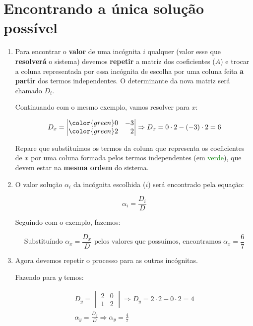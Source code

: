 \section{Encontrando a única solução possível}

\begin{enumerate}
    \item Para encontrar o \textbf{valor} de uma incógnita $i$ qualquer (valor esse que \textbf{resolverá} o sistema) devemos \textbf{repetir} a matriz dos coeficientes ($A$) e trocar a coluna representada por essa incógnita de escolha por uma coluna feita \textbf{a partir} dos termos independentes. O determinante da nova matriz será chamado $D_i$.
    
    Continuando com o mesmo exemplo, vamos resolver para $x$:
    
    $$
    D_x=\begin{vmatrix*}[r]
    \color{green}0 & -3\\ \color{green}2 & 2
    \end{vmatrix*} \Rightarrow \\
    D_x=0 \cdot 2 -(-3)\cdot 2 = 6
    $$
    
    Repare que substituímos os termos da coluna que representa os coeficientes de $x$ por uma coluna formada pelos termos independentes (em \textcolor{green}{verde}), que devem estar na \textbf{mesma ordem} do sistema.
    
    \item O valor solução $\alpha_i$ da incógnita escolhida ($i$) será encontrado pela equação:
    
    $$
    \alpha_i=\frac{D_i}{D}
    $$
    
    Seguindo com o exemplo, fazemos:
    
    $$
    \text{Substituíndo } \alpha_x = \frac{D_x}{D} \text{ pelos valores que possuímos, encontramos } \alpha_x=\frac{6}{7}
    $$
    
    \item Agora devemos repetir o processo para as outras incógnitas.
    
    Fazendo para $y$ temos:
    
    \begin{gather*}
        D_y=\begin{vmatrix}
        2 & 0\\ 1 & 2
        \end{vmatrix} \Rightarrow D_y= 2\cdot 2-0\cdot 2=4\\
        \alpha_y=\frac{D_y}{D}\Rightarrow\alpha_y=\frac{4}{7}
    \end{gather*}
    

\end{enumerate}
